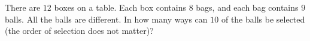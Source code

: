 There are $12$ boxes on a table. Each box contains $8$ bags, and each bag contains $9$ balls. All the balls are different. In how many ways can $10$ of the balls be selected (the order of selection does not matter)?
